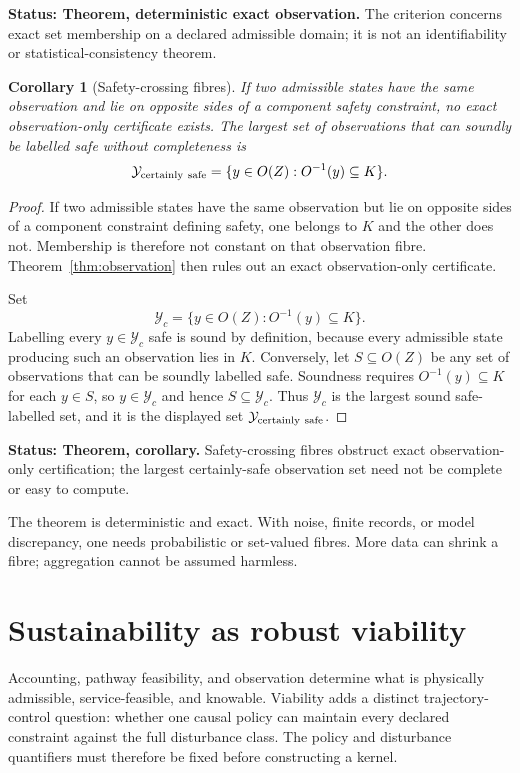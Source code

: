\documentclass[11pt]{article}
\newtheorem{corollary}{Corollary}
\theoremstyle{definition}
\newcommand{\status}[1]{\par\smallskip\noindent\textbf{Status: #1.}\quad}
\begin{document}
\status{Theorem, deterministic exact observation} The criterion concerns exact set membership on a declared admissible domain; it is not an identifiability or statistical-consistency theorem.

\begin{corollary}[Safety-crossing fibres]
If two admissible states have the same observation and lie on opposite sides of a component safety constraint, no exact observation-only certificate exists. The largest set of observations that can soundly be labelled safe without completeness is
\[
\mathcal Y_{\rm certainly\ safe}=\{y\in O(Z):O^{-1}(y)\subseteq K\}.
\]
\end{corollary}

\begin{proof}
If two admissible states have the same observation but lie on opposite sides of a component constraint defining safety, one belongs to $K$ and the other does not. Membership is therefore not constant on that observation fibre. Theorem~\ref{thm:observation} then rules out an exact observation-only certificate.

Set
\[
\mathcal Y_c=\{y\in O(Z):O^{-1}(y)\subseteq K\}.
\]
Labelling every $y\in \mathcal Y_c$ safe is sound by definition, because every admissible state producing such an observation lies in $K$. Conversely, let $S\subseteq O(Z)$ be any set of observations that can be soundly labelled safe. Soundness requires $O^{-1}(y)\subseteq K$ for each $y\in S$, so $y\in \mathcal Y_c$ and hence $S\subseteq \mathcal Y_c$. Thus $\mathcal Y_c$ is the largest sound safe-labelled set, and it is the displayed set $\mathcal Y_{\rm certainly\ safe}$.
\end{proof}

\status{Theorem, corollary} Safety-crossing fibres obstruct exact observation-only certification; the largest certainly-safe observation set need not be complete or easy to compute.

The theorem is deterministic and exact. With noise, finite records, or model discrepancy, one needs probabilistic or set-valued fibres. More data can shrink a fibre; aggregation cannot be assumed harmless.

\section{Sustainability as robust viability}

Accounting, pathway feasibility, and observation determine what is physically admissible, service-feasible, and knowable. Viability adds a distinct trajectory-control question: whether one causal policy can maintain every declared constraint against the full disturbance class. The policy and disturbance quantifiers must therefore be fixed before constructing a kernel.
\end{document}
